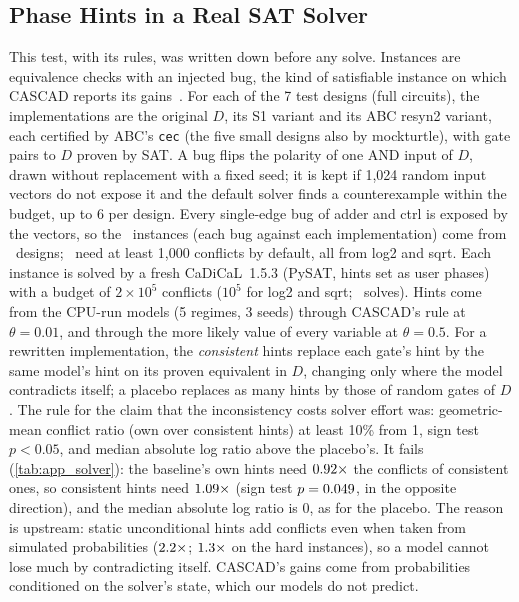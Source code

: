 \subsection{Phase Hints in a Real SAT Solver}\label{app:solver}
This test, with its rules, was written down before any solve. Instances are equivalence checks with an injected bug,
the kind of satisfiable instance on which CASCAD reports its gains~\cite{DBLP:journals/corr/abs-2508-04235}. For each of the 7 test designs (full
circuits), the implementations are the original $D$, its S1 variant and its ABC resyn2 variant, each certified by ABC's
\texttt{cec} (the five small designs also by mockturtle), with gate pairs to $D$ proven by SAT. A bug flips the polarity of
one AND input of $D$, drawn without replacement with a fixed seed; it is kept if 1{,}024 random input vectors do not
expose it and the default solver finds a counterexample within the budget, up to 6 per design. Every single-edge bug of
adder and ctrl is exposed by the vectors, so the \PhInst\ instances (each bug against each implementation) come from
\PhDesigns\ designs; \PhHard\ need at least 1{,}000 conflicts by default, all from log2 and sqrt. Each instance is solved by
a fresh CaDiCaL~1.5.3 (PySAT, hints set as user phases) with a budget of $2\times10^5$ conflicts ($10^5$ for log2 and sqrt;
\PhSolves\ solves). Hints come from the CPU-run models (5 regimes, 3 seeds) through CASCAD's rule at $\theta=0.01$, and
through the more likely value of every variable at $\theta=0.5$. For a rewritten implementation, the \emph{consistent} hints
replace each gate's hint by the same model's hint on its proven equivalent in $D$, changing only where the model
contradicts itself; a placebo replaces as many hints by those of random gates of $D$. The rule for the claim that the
inconsistency costs solver effort was: geometric-mean conflict ratio (own over consistent hints) at least 10\% from 1,
sign test $p<0.05$, and median absolute log ratio above the placebo's. It fails (\cref{tab:app_solver}): the baseline's
own hints need $0.92\times$ the conflicts of consistent ones, so consistent hints need $1.09\times$ (sign test $p=0.049$, in the opposite direction), and
the median absolute log ratio is 0, as for the placebo. The reason is upstream: static unconditional hints add
conflicts even when taken from simulated probabilities ($2.2\times$; $1.3\times$ on the hard
instances), so a model cannot lose much by contradicting itself. CASCAD's gains come from probabilities conditioned on
the solver's state, which our models do not predict.

